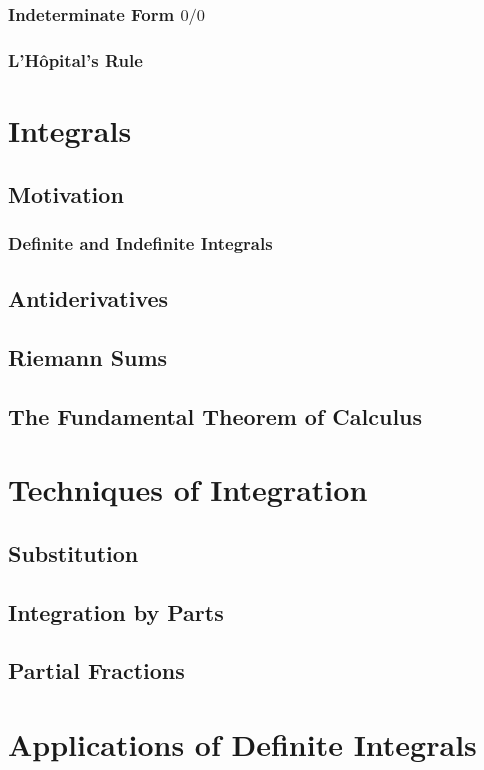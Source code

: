 \subsection{Indeterminate Form $0/0$}
\subsection{L'Hôpital's Rule}

\chapter{Integrals}
\section{Motivation}
\subsection{Definite and Indefinite Integrals}

\section{Antiderivatives}

\section{Riemann Sums}


\section{The Fundamental Theorem of Calculus}

\chapter{Techniques of Integration}
\section{Substitution}


\section{Integration by Parts}



\section{Partial Fractions}

\chapter{Applications of Definite Integrals}

\chapter{}
